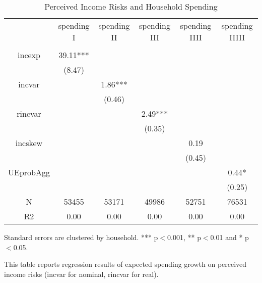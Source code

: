 \begin{table}[p]
\centering
\begin{adjustbox}{width={0.9\textwidth}}
\begin{threeparttable}
\caption{Perceived Income Risks and Household Spending}
\label{spending_reg}\begin{tabular}{cccccc}
\toprule
{} & spending I & spending II & spending III & spending IIII & spending IIIII \\
          &            &             &              &               &                \\
\midrule
incexp    &   39.11*** &             &              &               &                \\
          &     (8.47) &             &              &               &                \\
incvar    &            &     1.86*** &              &               &                \\
          &            &      (0.46) &              &               &                \\
rincvar   &            &             &      2.49*** &               &                \\
          &            &             &       (0.35) &               &                \\
incskew   &            &             &              &          0.19 &                \\
          &            &             &              &        (0.45) &                \\
UEprobAgg &            &             &              &               &          0.44* \\
          &            &             &              &               &         (0.25) \\
N         &      53455 &       53171 &        49986 &         52751 &          76531 \\
R2        &       0.00 &        0.00 &         0.00 &          0.00 &           0.00 \\
\bottomrule
\end{tabular}
\begin{tablenotes}\item Standard errors are clustered by household. *** p$<$0.001, ** p$<$0.01 and * p$<$0.05. 
\item This table reports regression results of expected spending growth on perceived income risks (incvar for nominal, rincvar for real).
\end{tablenotes}
\end{threeparttable}
\end{adjustbox}
\end{table}